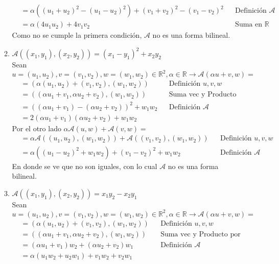 \documentclass{article}
\newcommand{\R}{\mathbb{R}}
\newcommand{\A}{\mathcal{A}}
\begin{document}
\begin{enumerate}
\begin{enumerate}
\begin{align*}
                        &=\alpha((u_1+u_2)^2-(u_1-u_2)^2)+(v_1+v_2)^2-(v_1-v_2)^2&&\text{Definición }\A\\
                        &=\alpha(4u_1u_2)+4v_1v_2&&\text{Suma en }\R
                    \end{align*}
                    Como no se cumple la primera condición, $\A$ no es una forma bilineal.
                \item $\A((x_1,y_1),(x_2,y_2))=(x_1-y_1)^2+x_2y_2$\\
                    Sean $u=(u_1,u_2),v=(v_1,v_2),w=(w_1,w_2)\in \R^2, \alpha \in \R\to \A(\alpha u+v,w)=$
                    \begin{align*}
                        &=(\alpha (u_1,u_2)+(v_1,v_2),(w_1,w_2)) &&\text{Definición $u,v,w$}\\
                        &=((\alpha u_1+v_1,\alpha u_2+v_2),(w_1,w_2)) &&\text{Suma vec y Producto por escalar}\\
                        &=((\alpha u_1+v_1)-(\alpha u_2+v_2))^2+w_1w_2 &&\text{Definición } \A\\
                        &=2(\alpha u_1+v_1)(\alpha u_2+v_2)+w_1w_2
                    \end{align*}
                    Por el otro lado $\alpha \A(u,w)+\A(v,w)=$
                    \begin{align*}
                        &=\alpha\A((u_1,u_2),(w_1,w_2))+\A((v_1,v_2),(w_1,w_2))&&\text{Definición }u,v,w\\
                        &=\alpha((u_1-u_2)^2+w_1w_2)+(v_1-v_2)^2+w_1w_2&&\text{Definición }\A
                    \end{align*}
                    En donde se ve que no son iguales, con lo cual $\A$ no es una forma bilineal.
                \item $\A((x_1,y_1),(x_2,y_2))=x_1y_2-x_2y_1$\\
                Sean $u=(u_1,u_2),v=(v_1,v_2),w=(w_1,w_2)\in \R^2, \alpha \in \R\to \A(\alpha u+v,w)=$
                \begin{align*}
                    &=(\alpha (u_1,u_2)+(v_1,v_2),(w_1,w_2)) &&\text{Definición $u,v,w$}\\
                    &=((\alpha u_1+v_1,\alpha u_2+v_2),(w_1,w_2)) &&\text{Suma vec y Producto por escalar}\\
                    &=(\alpha u_1+v_1)w_2+(\alpha u_2+v_2)w_1&&\text{Definición } \A\\
                    &=\alpha(u_1w_2+u_2w_1)+v_1w_2+v_2w_1\\

\end{align*}
\end{enumerate}
\end{enumerate}
\end{document}
